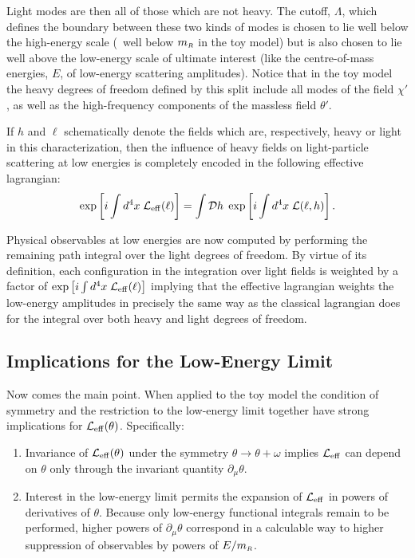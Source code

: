  Light modes are then all of
those which are not heavy. The cutoff, $\Lambda$,
which defines the boundary between these two kinds
of modes is chosen to lie well below the high-energy
scale (\ie\ well below $m_{\scriptscriptstyle R}$ in the toy model)
but is also chosen to lie well above the low-energy scale
of ultimate interest (like the centre-of-mass energies, 
$E$, of low-energy scattering amplitudes). Notice that
in the toy model the heavy degrees of freedom defined
by this split include all modes of the field $\chi'$, as well 
as the high-frequency components of the massless field $\theta'$.

If $h$ and $\ell$ schematically denote the fields which are,
respectively, heavy
or light in this characterization, then the influence of heavy
fields on light-particle scattering at low energies is completely
encoded in the following effective lagrangian:
%
\begin{equation}
\label{leffdef}
\exp\left[i \int d^4x \; {\cal L}_{\rm eff}(\ell) \right]
= \int {\cal D}h \; \exp\left[ i \int d^4x \;
{\cal L}(\ell,h) \right]. 
\end{equation}

Physical observables at low energies are now computed 
by performing the remaining path integral over the light
degrees of freedom. By virtue of its definition, each
configuration in the integration over light fields is weighted by a 
factor of $\exp\left[i \int d^4x \; {\cal L}_{\rm eff}(\ell) \right]$
implying that the effective lagrangian weights the low-energy
amplitudes in precisely the same way as the classical lagrangian
does for the integral over both heavy and light degrees of freedom.

\subsection{Implications for the Low-Energy Limit}

Now comes the main point. When applied to the toy model
the condition of symmetry and the restriction to the low-energy
limit together have strong implications for ${\cal L}_{\rm eff}(\theta)$.
Specifically:

\begin{enumerate}
\item
Invariance of ${\cal L}_{\rm eff}(\theta)$ under the symmetry 
$\theta \to \theta + \omega$ implies ${\cal L}_{\rm eff}$ can
depend on $\theta$ only through the invariant quantity 
$\partial_\mu \theta$.
%
\item
Interest in the low-energy limit permits the expansion of 
${\cal L}_{\rm eff}$ in powers of derivatives of $\theta$.
Because only low-energy functional integrals remain
to be performed, higher powers of $\partial_\mu\theta$
correspond in a calculable way to higher suppression
of observables by powers of $E/m_{\scriptscriptstyle R}$.
%
\end{enumerate}

